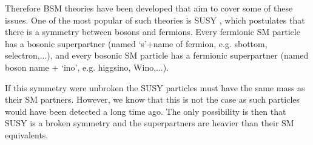 Therefore \acf{BSM} theories have been developed
that aim to cover some of these issues. One of the most
popular of such theories is \acf{SUSY} \cite{SUSY-primer}, which postulates
that there is a symmetry between bosons and fermions. Every fermionic
\ac{SM} particle has a bosonic superpartner (named `s'+name of fermion, e.g.
sbottom, selectron,...), and every bosonic \ac{SM} particle
has a fermionic superpartner (named boson name + `ino', e.g. higgsino, Wino,...).

If this symmetry were unbroken the \ac{SUSY} particles must
have the same mass as their \ac{SM} partners. However, we know that
this is not the case as such particles would have been detected a long time ago. The 
only possibility is then that \ac{SUSY} is a broken symmetry and the superpartners
are heavier than their \ac{SM} equivalents.

